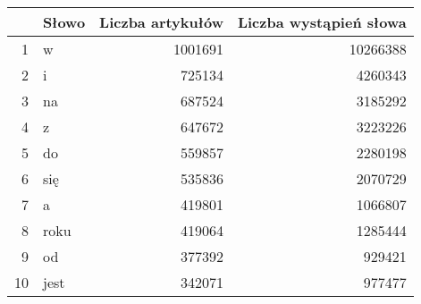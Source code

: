\documentclass[12pt, twoside, openany]{report}
\theoremstyle{plain}
\begin{document}
\begin{tabular}{rlrr}
  \hline
 & Słowo & Liczba artykułów & Liczba wystąpień słowa \\ 
  \hline
1 & w & 1001691 & 10266388 \\ 
  2 & i & 725134 & 4260343 \\ 
  3 & na & 687524 & 3185292 \\ 
  4 & z & 647672 & 3223226 \\ 
  5 & do & 559857 & 2280198 \\ 
  6 & się & 535836 & 2070729 \\ 
  7 & a & 419801 & 1066807 \\ 
  8 & roku & 419064 & 1285444 \\ 
  9 & od & 377392 & 929421 \\ 
  10 & jest & 342071 & 977477 \\ 
   \hline
\end{tabular}
\end{document}
